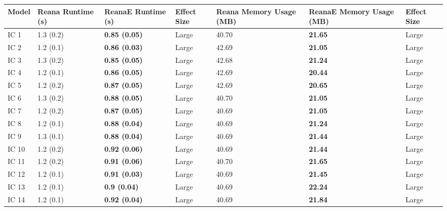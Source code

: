 \begin{tabular}{lllllll}
\toprule
 Model & Reana Runtime (s) &    ReanaE Runtime (s) & Effect Size & Reana Memory Usage (MB) & ReanaE Memory Usage (MB) & Effect Size \\
\midrule
  IC 1 &         1.3 (0.2) &  \textbf{0.85 (0.05)} &       Large &                   40.70 &           \textbf{21.65} &       Large \\
  IC 2 &         1.2 (0.1) &  \textbf{0.86 (0.03)} &       Large &                   42.69 &           \textbf{21.05} &       Large \\
  IC 3 &         1.3 (0.2) &  \textbf{0.85 (0.05)} &       Large &                   42.68 &           \textbf{21.24} &       Large \\
  IC 4 &         1.2 (0.1) &  \textbf{0.86 (0.05)} &       Large &                   42.69 &           \textbf{20.44} &       Large \\
  IC 5 &         1.2 (0.2) &  \textbf{0.87 (0.05)} &       Large &                   42.69 &           \textbf{20.65} &       Large \\
  IC 6 &         1.3 (0.2) &  \textbf{0.88 (0.05)} &       Large &                   40.70 &           \textbf{21.05} &       Large \\
  IC 7 &         1.2 (0.2) &  \textbf{0.87 (0.05)} &       Large &                   40.69 &           \textbf{21.05} &       Large \\
  IC 8 &         1.2 (0.1) &  \textbf{0.88 (0.04)} &       Large &                   40.69 &           \textbf{21.24} &       Large \\
  IC 9 &         1.3 (0.1) &  \textbf{0.88 (0.04)} &       Large &                   40.69 &           \textbf{21.44} &       Large \\
 IC 10 &         1.2 (0.2) &  \textbf{0.92 (0.06)} &       Large &                   40.69 &           \textbf{21.44} &       Large \\
 IC 11 &         1.2 (0.2) &  \textbf{0.91 (0.06)} &       Large &                   40.70 &           \textbf{21.65} &       Large \\
 IC 12 &         1.2 (0.1) &  \textbf{0.91 (0.03)} &       Large &                   40.69 &           \textbf{21.45} &       Large \\
 IC 13 &         1.2 (0.1) &   \textbf{0.9 (0.04)} &       Large &                   40.69 &           \textbf{22.24} &       Large \\
 IC 14 &         1.2 (0.1) &  \textbf{0.92 (0.04)} &       Large &                   40.69 &           \textbf{21.84} &       Large \\

\end{tabular}
